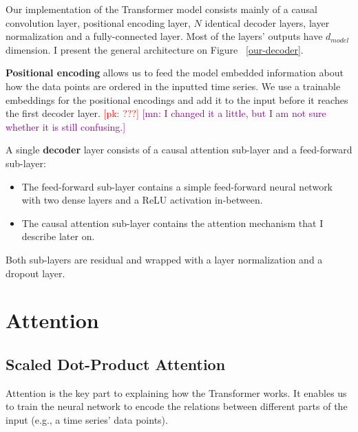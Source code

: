 \documentclass[en]{pracamgr}
\newcommand{\pk}[1]{\textcolor{red}{\small [pk: #1]}}
\newcommand{\mn}[1]{\textcolor{purple}{\small [mn: #1]}}
\begin{document}

Our implementation of the Transformer model consists mainly of a causal convolution layer, positional encoding layer, $N$ identical decoder layers, layer normalization and a fully-connected layer. 
Most of the layers' outputs have $d_{model}$ dimension.
I present the general architecture on Figure ~\ref{our-decoder}.

\textbf{Positional encoding} allows us to feed the model embedded information about how the data points are ordered in the inputted time series.
We use a trainable embeddings for the positional encodings and add it to the input before it reaches the first decoder layer. \pk{???} \mn{I changed it a little, but I am not sure whether it is still confusing.}

A single \textbf{decoder} layer consists of a causal attention sub-layer and a feed-forward sub-layer:
\begin{itemize}
	\item The feed-forward sub-layer contains a simple feed-forward neural network with two dense layers and a ReLU activation in-between.
	\item The causal attention sub-layer contains the attention mechanism that I describe later on.
\end{itemize}

Both sub-layers are residual and wrapped with a layer normalization and a dropout layer.

\section{Attention}

\subsection{Scaled Dot-Product Attention}

Attention is the key part to explaining how the Transformer works.
It enables us to train the neural network to encode the relations between different parts of the input (e.g., a time series' data points).


%
\end{document}
